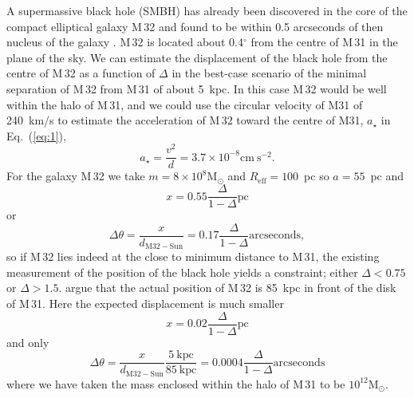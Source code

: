 \documentclass[useAMS,usenatbib]{mn2e}
\newcommand{\msun}{\mathrm{M}_\odot}
\begin{document}
A supermassive black hole (SMBH) has already been discovered in the
core of the compact elliptical galaxy M\,32
\citep{1997Natur.385..610V} and found to be within 0.5 arcseconds of
then nucleus of the galaxy \citep{2015arXiv150203231Y}.  M\,32 is
located about 0.4$^\circ$ from the centre of M\,31 in the plane of the
sky.  We can estimate the displacement of the black hole from the
centre of M\,32 as a function of $\Delta$ in the best-case scenario of
the minimal separation of M\,32 from M\,31 of about 5~kpc.  In this
case M\,32 would be well within the halo of M\,31, and we could use
the circular velocity of M31 of 240~km/s to estimate the acceleration
of M\,32 toward the centre of M31, $a_\star$ in Eq.~(\ref{eq:1}),
\begin{equation}
  a_\star = \frac{v^2}{d} = 3.7\times 10^{-8} \mathrm{cm~s}^{-2}
  \label{eq:7}.
\end{equation}
For the galaxy M\,32 we take $m=8 \times 10^8 \msun$ and
$R_\mathrm{eff} = 100$~pc so $a=55$~pc and
\begin{equation}
  x = 0.55 \frac{\Delta}{1-\Delta} \mathrm{pc}
  \label{eq:8}
\end{equation}
or
\begin{equation}
  \Delta \theta = \frac{x}{d_\mathrm{M32-Sun}} = 0.17 \frac{\Delta}{1-\Delta} \mathrm{arcseconds},
  \label{eq:9}
\end{equation}
so if M\,32 lies indeed at the close to minimum distance to M\,31, the
existing measurement of the position of the black hole yields a
constraint; either $\Delta < 0.75$ or $\Delta>1.5$.
\citet{2014ApJ...788L..38D} argue that the actual position of M\,32 is
85~kpc in front of the disk of M\,31.  Here the expected displacement
is much smaller
\begin{equation}
  x = 0.02 \frac{\Delta}{1-\Delta} \mathrm{pc}
  \label{eq:10}
\end{equation}
and only
\begin{equation} 
  \Delta \theta = \frac{x}{d_\mathrm{M32-Sun}}
  \frac{5~\mathrm{kpc}}{85~\mathrm{kpc}} = 0.0004
  \frac{\Delta}{1-\Delta} \mathrm{arcseconds}
  \label{eq:11}
\end{equation}
where we have taken the mass enclosed within the halo of M\,31 to
be $10^{12} \msun$.
\end{document}
